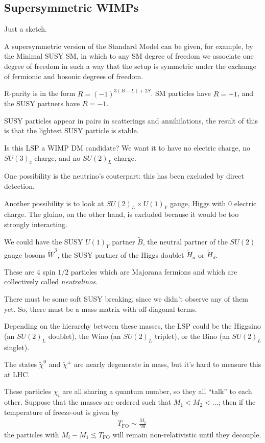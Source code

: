 \documentclass[main.tex]{subfiles}
\begin{document}
\subsection{Supersymmetric WIMPs}

Just a sketch. 

A supersymmetric version of the Standard Model can be given, for example, by the Minimal SUSY SM, in which to any SM degree of freedom
we associate one degree of freedom in such a way that the setup is symmetric under the exchange of fermionic and bosonic degrees of freedom. 

R-parity is in the form \(R = (-1)^{3(B-L) + 2S}\). 
SM particles have \(R = +1\), and the SUSY partners have \(R = -1\). 

SUSY particles appear in pairs in scatterings and annihilations, 
the result of this is that the lightest SUSY particle is stable. 

Is this LSP a WIMP DM candidate? 
We want it to have no electric charge, no \(SU(3)_c\) charge, and no \(SU(2)_L\) charge. 

One possibility is the neutrino's couterpart: this has been excluded by direct detection. 

Another possibility is to look at \(SU(2)_L \times U(1)_Y\) gauge, Higgs with 0 electric charge.
The gluino, on the other hand, is excluded because it would be too strongly interacting. 

We could have the SUSY \(U(1)_Y\) partner \(\widetilde{B}\), 
the neutral partner of the \(SU(2)\) gauge bosons \(\widetilde{W}^3\), 
the SUSY partner of the Higgs doublet \(\widetilde{H}_u\) or \(\widetilde{H}_d\). 

These are 4 spin \(1/2\) particles which are Majorana fermions and 
which are collectively called \emph{neutralinos}. 

There must be some soft SUSY breaking, since we didn't observe any of them yet. 
So, there must be a mass matrix with off-diagonal terms. 

Depending on the hierarchy between these masses, the LSP could be 
the Higgsino (an \(SU(2)_L\) doublet),
the Wino (an \(SU(2)_L\) triplet), or
the Bino (an \(SU(2)_L\) singlet).

The states \(\widetilde{\chi}^0\) and \(\widetilde{\chi}^{\pm}\) are nearly degenerate in mass, but it's hard to measure this at LHC. 

These particles \(\chi _i\) are all sharing a quantum number, so 
they all ``talk'' to each other. 
Suppose that the masses are ordered such that \(M_1 < M_2 < \dots\); 
then if the temperature of freeze-out is given by 
%
\begin{align}
T _{\text{FO}} \sim \frac{M_1}{20}
\,
\end{align}
%
the particles with \(M_i - M_1 \lesssim T _{\text{FO}} \) will remain non-relativistic until they decouple. 
\end{document}
